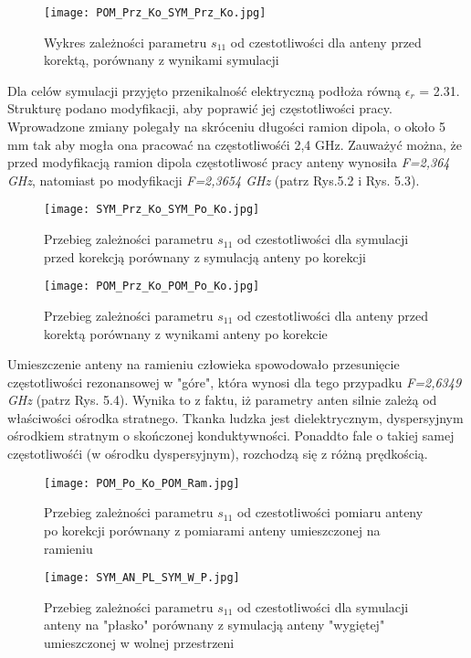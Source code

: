 \begin{figure}[h!]
\centering
	\texttt{[image: POM\_Prz\_Ko\_SYM\_Prz\_Ko.jpg]}
	\caption{Wykres zależności parametru $s_{11}$ od czestotliwości dla anteny przed korektą, porównany z wynikami symulacji}
\end{figure}


\newpage
\noindent
\newline Dla celów symulacji przyjęto przenikalność elektryczną podłoża równą $\epsilon_{r}$ = 2.31. Strukturę podano modyfikacji, aby poprawić jej częstotliwości pracy. Wprowadzone zmiany polegały na skróceniu długości ramion dipola, o około 5 mm tak aby mogła ona pracować na częstotliwośći 2,4 GHz. Zauważyć można, że przed modyfikacją ramion dipola częstotliwosć pracy anteny wynosiła \emph{F=2,364 GHz}, natomiast po modyfikacji \emph{F=2,3654 GHz} (patrz Rys.5.2 i Rys. 5.3).  

\begin{figure}[H]
\centering
	\texttt{[image: SYM\_Prz\_Ko\_SYM\_Po\_Ko.jpg]}
	\caption{Przebieg zależności parametru $s_{11}$ od czestotliwości dla symulacji przed korekcją porównany z symulacją anteny po korekcji}
\end{figure}

\newpage
\begin{figure}[H]
\centering
	\texttt{[image: POM\_Prz\_Ko\_POM\_Po\_Ko.jpg]}
	\caption{Przebieg zależności parametru $s_{11}$ od czestotliwości dla anteny przed korektą porównany z wynikami anteny po korekcie}
\end{figure}


\newpage
\noindent
\newline Umieszczenie anteny na ramieniu człowieka spowodowało przesunięcie częstotliwości rezonansowej w "góre", która wynosi dla tego przypadku \emph{F=2,6349 GHz} (patrz Rys. 5.4). Wynika to z faktu, iż parametry anten silnie zależą od właściwości ośrodka stratnego.  
Tkanka ludzka jest dielektrycznym, dyspersyjnym ośrodkiem stratnym o skończonej konduktywności. Ponaddto fale o takiej samej częstotliwośći (w ośrodku dyspersyjnym), rozchodzą się z różną prędkością. 


\begin{figure}[H]
\centering
	\texttt{[image: POM\_Po\_Ko\_POM\_Ram.jpg]}
	\caption{Przebieg zależności parametru $s_{11}$ od czestotliwości pomiaru anteny po korekcji porównany z pomiarami anteny umieszczonej na ramieniu}
\end{figure}


\newpage
\begin{figure}[H]
\centering
	\texttt{[image: SYM\_AN\_PL\_SYM\_W\_P.jpg]}
	\caption{Przebieg zależności parametru $s_{11}$ od czestotliwości dla symulacji anteny na "płasko" porównany z symulacją anteny "wygiętej" umieszczonej w wolnej przestrzeni}
\end{figure}


